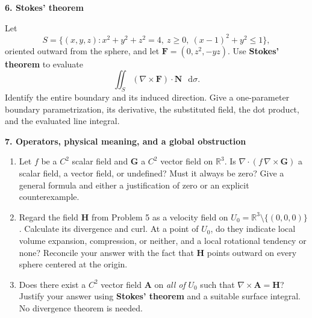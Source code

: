 \documentclass[11pt,letterpaper]{article}
\newcommand{\curl}{\nabla\times}
\newcommand{\dv}{\nabla\cdot}
\renewcommand{\vec}[1]{\mathbf{#1}}
\newcommand{\dd}{\mathop{}\!\mathrm{d}}
\newcommand{\examproblem}[3]{%
  \par\medskip\Needspace{5\baselineskip}
  \noindent\textbf{#1. #2}\par\nobreak
}
\begin{document}
\examproblem{6}{Stokes' theorem}{20}
Let
\[
S=\{(x,y,z):x^2+y^2+z^2=4,\ z\ge0,\ (x-1)^2+y^2\le1\},
\]
oriented outward from the sphere, and let $\vec F=(0,z^2,-yz)$.
Use \textbf{Stokes' theorem} to evaluate
\[
\iint_S(\curl\vec F)\cdot\vec N\,\dd\sigma.
\]
Identify the entire boundary and its induced direction. Give a
one-parameter boundary parametrization, its derivative, the substituted
field, the dot product, and the evaluated line integral.

\examproblem{7}{Operators, physical meaning, and a global obstruction}{14}
\begin{enumerate}[label=(\alph*)]
\item Let $f$ be a $C^2$ scalar field and $\vec G$ a $C^2$ vector field
on $\mathbb R^3$. Is $\dv(f\,\curl\vec G)$ a scalar field, a vector
field, or undefined? Must it always be zero? Give a general formula and
either a justification of zero or an explicit counterexample.
\item Regard the field $\vec H$ from Problem 5 as a velocity field on
$U_0=\mathbb R^3\setminus\{(0,0,0)\}$. Calculate its divergence and
curl. At a point of $U_0$, do they indicate local volume expansion,
compression, or neither, and a local rotational tendency or none?
Reconcile your answer with the fact that $\vec H$ points outward on
every sphere centered at the origin.
\item Does there exist a $C^2$ vector field $\vec A$ on \emph{all of}
$U_0$ such that $\curl\vec A=\vec H$? Justify your answer using
\textbf{Stokes' theorem} and a suitable surface integral. No divergence
theorem is needed.
\end{enumerate}
\end{document}
